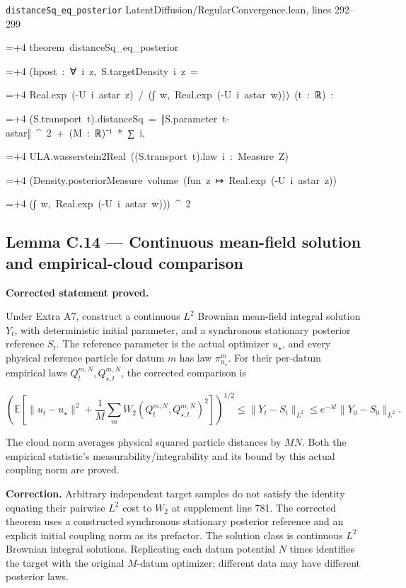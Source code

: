 \documentclass[11pt,a4paper]{report}
\newlength{\leancharwidth}
\newenvironment{leancode}{\par\smallskip\begingroup\ttfamily\footnotesize\raggedright
  \settowidth{\leancharwidth}{M}\setlength{\parskip}{0pt}\setlength{\parindent}{0pt}
  \frenchspacing}{\par\endgroup\smallskip}
\newcommand{\leanline}[2]{\hangindent=\dimexpr#1\leancharwidth+4\leancharwidth\relax
  \hangafter=1\noindent\hspace*{#1\leancharwidth}#2\par}
\newcommand{\leansource}[1]{\par{\footnotesize\color{leanmuted}#1}\par}
\begin{document}
\begin{leanbox}
\leansource{\texttt{distanceSq\_\allowbreak{}eq\_\allowbreak{}posterior} \quad LatentDiffusion/\allowbreak{}RegularConvergence.lean, lines 292–299}
\begin{leancode}
\leanline{0}{theorem\ distanceSq\_eq\_posterior}
\leanline{4}{(hpost\ :\ ∀\ i\ z,\ S.targetDensity\ i\ z\ =}
\leanline{6}{Real.exp\ (-U\ i\ astar\ z)\ /\ (∫\ w,\ Real.exp\ (-U\ i\ astar\ w)))\ (t\ :\ ℝ)\ :}
\leanline{4}{(S.transport\ t).distanceSq\ =\ ‖S.parameter\ t-astar‖\ \textasciicircum{}\ 2\ +\ (M\ :\ ℝ)⁻¹\ *\ ∑\ i,}
\leanline{6}{ULA.wasserstein2Real\ ((S.transport\ t).law\ i\ :\ Measure\ Z)}
\leanline{8}{(Density.posteriorMeasure\ volume\ (fun\ z\ ↦\ Real.exp\ (-U\ i\ astar\ z))}
\leanline{10}{(∫\ w,\ Real.exp\ (-U\ i\ astar\ w)))\ \textasciicircum{}\ 2}
\end{leancode}
\end{leanbox}
\subsection{\texorpdfstring{Lemma C.14 — Continuous mean-field solution and empirical-cloud comparison}{Lemma C.14 — Continuous mean-field solution and empirical-cloud comparison}}


\textbf{Corrected statement proved.}



Under Extra A7, construct a continuous
        \(L^2\) Brownian mean-field integral solution \(Y_t\), with
        deterministic initial parameter, and a synchronous
        stationary posterior reference \(S_t\). The reference parameter is the
        actual optimizer \(u_\star\), and every physical reference particle for
        datum \(m\) has law \(\pi_{u_\star}^m\). For their per-datum empirical
        laws \(Q_t^{m,N},Q_{\star,t}^{m,N}\), the corrected comparison is


        \[\left(\mathbb E\left[\|u_t-u_\star\|^2+
          \frac1M\sum_m W_2(Q_t^{m,N},Q_{\star,t}^{m,N})^2\right]
          \right)^{1/2}
          \le\|Y_t-S_t\|_{L^2}\le e^{-\lambda t}\|Y_0-S_0\|_{L^2}.\]


The cloud norm averages physical squared particle distances by
        \(MN\). Both the empirical statistic's measurability/\allowbreak{}integrability and
        its bound by this actual coupling norm are proved.



\textbf{Correction.} Arbitrary independent target samples do not satisfy the identity equating their pairwise \(L^2\) cost to \(W_2\) at supplement line 781. The corrected theorem uses a constructed synchronous stationary posterior reference and an explicit initial coupling norm as its prefactor. The solution class is continuous \(L^2\) Brownian integral solutions. Replicating each datum potential \(N\) times identifies the target with the original \(M\)-datum optimizer; different data may have different posterior laws.
\end{document}
